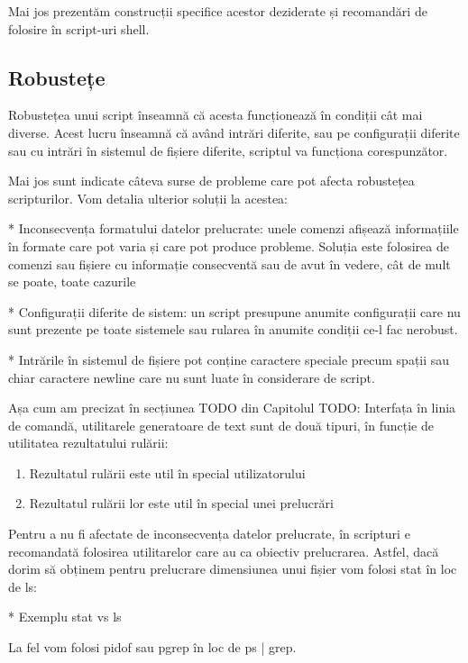 Mai jos prezentăm construcții specifice acestor deziderate și recomandări de
folosire în script-uri shell.

\subsection{Robustețe}
\label{sec:script-advancedfunc-robust}

Robustețea unui script înseamnă că acesta funcționează în condiții cât mai
diverse. Acest lucru înseamnă că având intrări diferite, sau pe configurații
diferite sau cu intrări în sistemul de fișiere diferite, scriptul va funcționa
corespunzător.

Mai jos sunt indicate câteva surse de probleme care pot afecta robustețea
scripturilor. Vom detalia ulterior soluții la acestea:

* Inconsecvența formatului datelor prelucrate: unele comenzi afișează
informațiile în formate care pot varia și care pot produce probleme. Soluția
este folosirea de comenzi sau fișiere cu informație consecventă sau de avut în
vedere, cât de mult se poate, toate cazurile

* Configurații diferite de sistem: un script presupune anumite configurații care
nu sunt prezente pe toate sistemele sau rularea în anumite condiții ce-l fac
nerobust.

* Intrările în sistemul de fișiere pot conține caractere speciale precum spații
sau chiar caractere newline care nu sunt luate în considerare de script.

Așa cum am precizat în secțiunea TODO din Capitolul TODO: Interfața în linia de
comandă, utilitarele generatoare de text sunt de două tipuri, în funcție de
utilitatea rezultatului rulării:

\begin{enumerate}
	\item Rezultatul rulării este util în special utilizatorului
	\item Rezultatul rulării lor este util în special unei prelucrări
\end{enumerate}

Pentru a nu fi afectate de inconsecvența datelor prelucrate, în scripturi e
recomandată folosirea utilitarelor care au ca obiectiv prelucrarea. Astfel, dacă
dorim să obținem pentru prelucrare dimensiunea unui fișier vom folosi stat în
loc de ls:

* Exemplu stat vs ls

La fel vom folosi pidof sau pgrep în loc de ps | grep.

